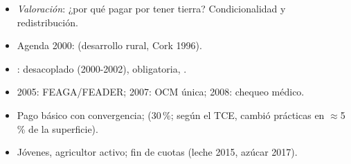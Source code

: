 \documentclass{article}
\begin{document}
\begin{columnas}
\begin{itemize}
\item \emph{Valoración}: ¿por qué pagar por tener tierra? Condicionalidad y redistribución.
\end{itemize}
\begin{itemize}
\item Agenda 2000:  (desarrollo rural, Cork 1996).
\item {}:  desacoplado (2000-2002),  obligatoria, .
\item 2005: FEAGA/FEADER; 2007: OCM única; 2008: chequeo médico.
\end{itemize}
\begin{itemize}
\item Pago básico con convergencia;  (30\,\%; según el TCE, cambió prácticas en $\approx$5\,\% de la superficie).
\item Jóvenes, agricultor activo; fin de cuotas (leche 2015, azúcar 2017).
\end{itemize}


\end{columnas}
\end{document}
